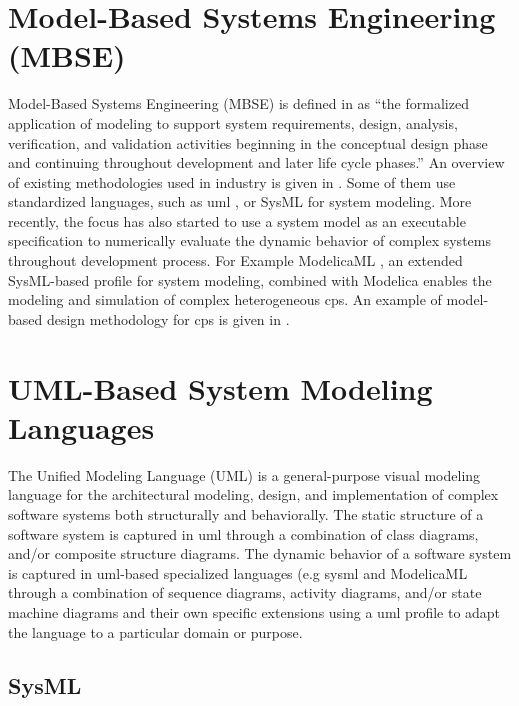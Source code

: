 \section{Model-Based Systems Engineering (MBSE)}
\label{sec:mbse}

Model-Based Systems Engineering (MBSE) is defined in \cite{mbsdincose} as “the formalized application of modeling to support system requirements, design, analysis, verification, and validation activities beginning in the conceptual design phase and continuing throughout development and later life cycle phases.” An overview of existing methodologies used in industry is given in \cite{mbsdestefan}. Some of them use standardized languages, such as \acrshort{uml} \cite{uml}, or SysML \cite{sysml} for system modeling. 
More recently, the focus has also started to use a system model as an executable specification to numerically evaluate the dynamic behavior of complex systems throughout development process. For Example ModelicaML \cite{modelicaml, modelicamlreport}, an extended SysML-based profile for system modeling, combined with Modelica enables the modeling and simulation of complex heterogeneous \acrshort{cps}. An example of model-based design methodology for \acrshort{cps} is given in \cite{mbsdjensen}.


\section{UML-Based System Modeling Languages}
\label{sec:uml}
   
The Unified Modeling Language (UML) \cite{uml} is a general-purpose visual modeling language for the architectural modeling, design, and implementation of complex software systems both structurally and behaviorally. The static structure of a software system is captured in \acrshort{uml} through a combination of class diagrams, and/or composite structure diagrams. The dynamic behavior of a software system is captured in \acrshort{uml}-based specialized languages (e.g \acrshort{sysml}\cite{sysml,sysmlmorgan} and ModelicaML\cite{modelicaml, modelicamlreport} through a combination of sequence diagrams, activity diagrams, and/or state machine diagrams and their own specific extensions using a \acrshort{uml} profile to adapt the language to a particular domain or purpose. 

\subsection{SysML}
\label{sec:sysml}


